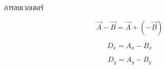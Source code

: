 \documentclass[12pt,a4paper]{report}
\begin{document}
\begin{tcolorbox}[title=สรุปบทที่ 3: เวกเตอร์ (ต่อ)]
\
การลบเวกเตอร์

\[
\vec{A}-\vec{B}=\vec{A}+(-\vec{B})
\]

\[
D_x=A_x-B_x
\]

\[
D_y=A_y-B_y
\]
\end{tcolorbox}





\end{document}
